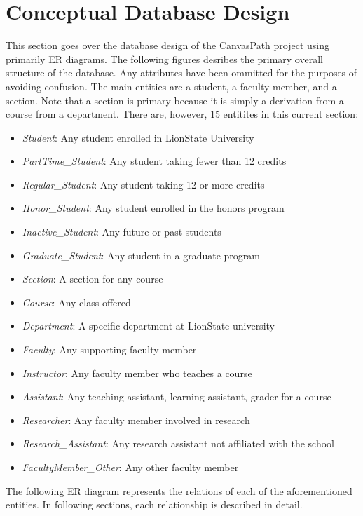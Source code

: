 \documentclass{article}
\begin{document}
  \section{Conceptual Database Design}\label{sec:Concept}
    This section goes over the database design of the CanvasPath project using primarily ER diagrams.  The following figures desribes the primary overall structure of the database.  Any attributes have been ommitted for the purposes of avoiding confusion.  The main entities are a student, a faculty member, and a section.  Note that a section is primary because it is simply a derivation from a course from a department.
    \newline
    \newline
    There are, however, 15 entitites in this current section:
    \begin{itemize}
      \item \textit{Student}: Any student enrolled in LionState University
      \item \textit{PartTime\_Student}: Any student taking fewer than 12 credits
      \item \textit{Regular\_Student}: Any student taking 12 or more credits
      \item \textit{Honor\_Student}: Any student enrolled in the honors program
      \item \textit{Inactive\_Student}: Any future or past students
      \item \textit{Graduate\_Student}: Any student in a graduate program
      \item \textit{Section}: A section for any course
      \item \textit{Course}: Any class offered
      \item \textit{Department}: A specific department at LionState university
      \item \textit{Faculty}: Any supporting faculty member
      \item \textit{Instructor}: Any faculty member who teaches a course
      \item \textit{Assistant}: Any teaching assistant, learning assistant, grader for a course
      \item \textit{Researcher}: Any faculty member involved in research
      \item \textit{Research\_Assistant}: Any research assistant not affiliated with the school
      \item \textit{FacultyMember\_Other}: Any other faculty member
    \end{itemize}
    The following ER diagram represents the relations of each of the aforementioned entities.  In following sections, each relationship is described in detail.
\end{document}
